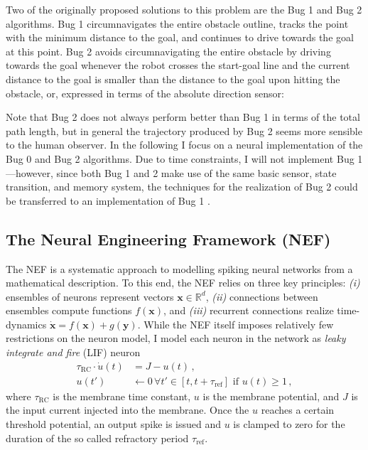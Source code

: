 \documentclass[letterpaper,10pt,conference]{ieeeconf}
\renewcommand{\vec}[1]{\bm{#1}}
\newcommand{\R}{{\mathbb{R}}}
\begin{document}
Two of the originally proposed solutions to this problem are the Bug 1 and Bug 2 algorithms. Bug 1 circumnavigates the entire obstacle outline, tracks the point with the minimum distance to the goal, and continues to drive towards the goal at this point. Bug 2 avoids circumnavigating the entire obstacle by driving towards the goal whenever the robot crosses the start-goal line and the current distance to the goal is smaller than the distance to the goal upon hitting the obstacle, or, expressed in terms of the absolute direction sensor:
\begin{algorithmic}[1]
	\EndWhile						
	\EndIf
	\EndWhile
\end{algorithmic}
Note that Bug 2 does not always perform better than Bug 1 in terms of the total path length, but in general the trajectory produced by Bug 2 seems more sensible to the human observer.
In the following I focus on a neural implementation of the Bug 0 and Bug 2 algorithms. Due to time constraints, I will not implement Bug 1---however, since both Bug 1 and 2 make use of the same basic sensor, state transition, and memory system, the techniques for the realization of Bug 2 could be transferred to an implementation of Bug 1	.


\subsection{The Neural Engineering Framework (NEF)}

The NEF \cite{eliasmith2003neural} is a systematic approach to modelling spiking neural networks from a mathematical description. To this end, the NEF relies on three key principles: \emph{(i)} ensembles of neurons represent vectors $\vec x \in \R^d$, \emph{(ii)} connections between ensembles compute functions $f(\vec x)$, and \emph{(iii)} recurrent connections realize time-dynamics $\dot {\vec x} = f(\vec x) + g(\vec y)$. While the NEF itself imposes relatively few restrictions on the neuron model, I model each neuron in the network as \emph{leaky integrate and fire} (LIF) neuron
\begin{align*}
	\tau_\mathrm{RC} \cdot \dot u(t) &= J - u(t)\,, \\
	u(t') &\gets 0 \, \forall t' \in [t, t + \tau_\mathrm{ref}]\text{ if } u(t) \geq 1 \,,
\end{align*}
where $\tau_\mathrm{RC}$ is the membrane time constant, $u$ is the membrane potential, and $J$ is the input current injected into the membrane. Once the $u$ reaches a certain threshold potential, an output spike is issued and $u$ is clamped to zero for the duration of the so called refractory period $\tau_\mathrm{ref}$.
\end{document}
